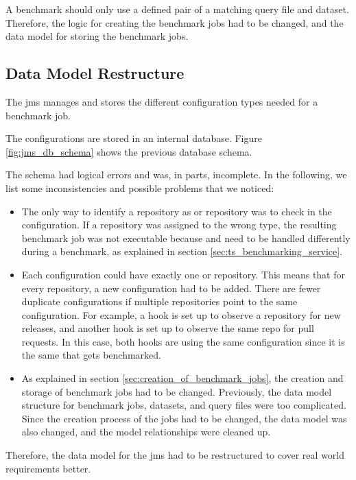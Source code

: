 A benchmark should only use a defined pair of a matching query file and dataset.
Therefore, the logic for creating the benchmark jobs had to be changed, and the data model for storing the benchmark jobs.


\subsection{Data Model Restructure}
\label{sec:review_data_model}
The \ac{jms} manages and stores the different configuration types needed for a benchmark job.

The configurations are stored in an internal database.
Figure \ref{fig:jms_db_schema} shows the previous database schema.

The schema had logical errors and was, in parts, incomplete.
In the following, we list some inconsistencies and possible problems that we noticed:
\begin{itemize}
	\item The only way to identify a repository as \gh{} or \dockh{} repository was to check in the \ts{} configuration.
		If a repository was assigned to the wrong type, the resulting benchmark job was not executable because \gh{} and \dockh{} need to be handled differently during a benchmark, as explained in section \ref{sec:ts_benchmarking_service}.
	
	\item Each \ts{} configuration could have exactly one \gh{} or \dockh{} repository.
		This means that for every repository, a new \ts{} configuration had to be added.
		There are fewer duplicate configurations if multiple repositories point to the same configuration.
		For example, a hook is set up to observe a \gh{} repository for new releases, and another hook is set up to observe the same \gh{} repo for pull requests.
		In this case, both hooks are using the same \ts{} configuration since it is the same \ts{} that gets benchmarked.
		
	\item As explained in section \ref{sec:creation_of_benchmark_jobs}, the creation and storage of benchmark jobs had to be changed.
		Previously, the data model structure for benchmark jobs, datasets, and query files were too complicated.
		Since the creation process of the jobs had to be changed, the data model was also changed, and the model relationships were cleaned up.
	
\end{itemize} 

Therefore, the data model for the \ac{jms} had to be restructured to cover real world requirements better.

